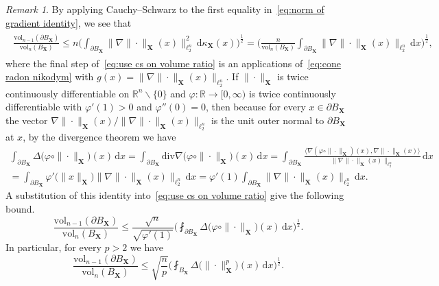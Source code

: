 \documentclass[11pt,reqno]{amsart}
\renewcommand{\le}{\leqslant}
\renewcommand{\setminus}{\smallsetminus}
\newcommand{\ud}[0]{\,\mathrm{d}}
\newcommand{\X}{\mathbf X}
\newcommand{\f}{\varphi}
\newcommand{\R}{\mathbb R}
\theoremstyle{remark}
\newtheorem{remark}[theorem]{Remark}
\newcommand{\vol}{\mathrm{vol}}
\renewcommand{\1}{\mathbf 1}
\begin{document}
\begin{remark}
By applying Cauchy--Schwarz to the first equality in~\eqref{eq:norm of gradient identity}, we see that
\begin{align}\label{eq:use cs on volume ratio}
\begin{split}
\frac{\vol_{n-1}(\partial B_{\X})}{\vol_n(B_{\X})}\le n\bigg(\int_{\partial B_{\X}}\big\|\nabla\|\cdot\|_{\X}(x)\big\|_{\ell_2^n}^2\ud\kappa_{\X}(x)\bigg)^{\frac12}=
\bigg(\frac{n}{\vol_n(B_{\X})}\int_{\partial B_{\X}}\big\|\nabla\|\cdot\|_{\X}(x)\big\|_{\ell_2^n}\ud x\bigg)^{\frac12},
\end{split}
\end{align}
where the final step of~\eqref{eq:use cs on volume ratio} is an applications of~\eqref{eq:cone radon nikodym} with $g(x)= \|\nabla\|\cdot\|_{\X}(x)\|_{\ell_2^n}$.  If $\|\cdot\|_{\X}$ is twice continuously differentiable on $\R^n\setminus\{0\}$ and  $\f:\R\to [0,\infty)$ is twice continuously differentiable with $\f'(1)>0$ and $\f''(0)=0$, then because for every $x\in \partial B_{\X}$ the vector $\nabla\|\cdot\|_{\X}(x)/\|\nabla\|\cdot\|_{\X}(x)\|_{\ell_2^n}$ is the unit outer normal to $\partial B_{\X}$ at $x$, by the divergence theorem we have
\begin{multline*}
\int_{\partial B_{\X}}\Delta \big(\f\circ \|\cdot\|_{\X}\big) (x)\ud x=\int_{\partial B_{\X}} \mathrm{div} \nabla\big(\f\circ\|\cdot\|_{\X}\big)(x)\ud x=\int_{\partial B_{\X}} \frac{\langle \nabla(\f\circ\|\cdot\|_{\X})(x),\nabla\|\cdot\|_{\X}(x)\rangle}{\big\|\nabla\|\cdot\|_{\X}(x)\big\|_{\ell_2^n}}\ud x\\=
\int_{\partial B_{\X}} \f'\big(\|x\|_{\X}\big)\big\|\nabla\|\cdot\|_{\X}(x)\big\|_{\ell_2^n}\ud x=\f'(1)\int_{\partial B_{\X}}\big\|\nabla\|\cdot\|_{\X}(x)\big\|_{\ell_2^n}\ud x.
\end{multline*}
A substitution of this identity into~\eqref{eq:use cs on volume ratio} give the following bound.
\begin{equation}\label{eq:laplacian psi}
\frac{\vol_{n-1}(\partial B_{\X})}{\vol_n(B_{\X})}\le\frac{\sqrt{n}}{\sqrt{\f'(1)}}\bigg(\fint_{\partial B_{\X}}\Delta \big(\f\circ \|\cdot\|_{\X}\big) (x)\ud x\bigg)^{\frac12}.
\end{equation}
In particular, for every $p>2$ we have
\begin{equation}\label{eq:laplacial p}
\frac{\vol_{n-1}(\partial B_{\X})}{\vol_n(B_{\X})}\le\sqrt{\frac{n}{p}}\bigg(\fint_{ B_{\X}}\Delta \big(\|\cdot\|_{\X}^p\big) (x)\ud x\bigg)^{\frac12}.
\end{equation}

\end{remark}
\end{document}
